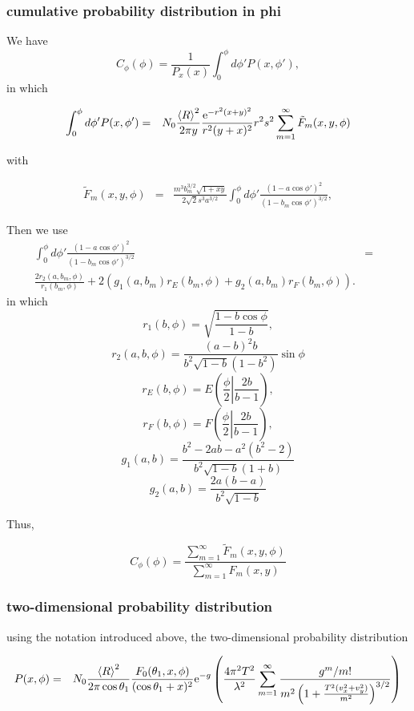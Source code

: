 \documentclass[11pt]{article}
\newcommand{\e}{{\rm e}}
\begin{document}
{{{{%
\subsubsection{cumulative probability distribution in phi}

We have
$$C_{\phi}(\phi)=\frac{1}{P_x(x)}\int_{0}^{\phi}d\phi'P(x,\phi'),$$
in which


\begin{eqnarray}
\int_{0}^{\phi}d\phi'P(x,\phi')&=&N_{0}\frac{\left<R\right>^{2}}{2\pi y}\frac{\e^{-r^{2}(x+y)^{2}}}{r^{2}(y+x)^{2}}
r^{2}s^{2}
\sum_{m=1}^{\infty}\tilde {F}_{m}(x,y,\phi)
\end{eqnarray}

with

\begin{eqnarray} \tilde F_{m}(x,y,\phi)&=&\frac{m^{3}b_{m}^{3/2}\sqrt{1+xy}}{2\sqrt{2}s^{3}a^{3/2}}\int_{0}^{\phi}d\phi'\frac{\left(1-a\cos\phi'\right)^{2}}{(1-b_m\cos\phi')^{3/2}},
\end{eqnarray}


Then we use
\begin{eqnarray}
\int_{0}^{\phi}d\phi'\frac{\left(1-a\cos\phi' \right)^{2}}{(1-b_m\cos\phi')^{3/2}}&=&\\
\frac{2r_{2}(a,b_m,\phi)}{r_{1}(b_m,\phi)}+2(g_{1}(a,b_m)r_{E}(b_m,\phi)+g_{2}(a,b_m)r_{F}(b_m,\phi)).
\end{eqnarray}
in which
$$r_{1}(b,\phi)=\sqrt{\frac{1-b\cos\phi}{1-b}},$$
$$r_{2}(a,b,\phi)=\frac{(a-b)^{2}b}{b^{2}\sqrt{1-b}(1-b^{2})}\sin\phi$$
$$r_{E}(b,\phi)=E\left(\frac{\phi}{2}\left|\frac{2b}{b-1}\right.\right),$$
$$r_{F}(b,\phi)=F\left(\frac{\phi}{2}\left|\frac{2b}{b-1}\right.\right),$$
$$g_{1}(a,b)=\frac{b^{2}-2ab-a^{2}(b^{2}-2)}{b^{2}\sqrt{1-b}(1+b)}$$
$$g_{2}(a,b)=\frac{2a(b-a)}{b^{2}\sqrt{1-b}}$$

Thus,

$$C_{\phi}(\phi)=\frac{\sum_{m=1}^{\infty} \tilde F_{m}(x,y,\phi)}{\sum_{m=1}^{\infty} F_{m}(x,y)}$$

\subsubsection{two-dimensional probability distribution}

using the notation introduced above, the two-dimensional probability distribution

\begin{eqnarray}
P(x,\phi)&=&N_{0}\frac{\left<R\right>^{2}}{2\pi\cos\theta_{1}}\frac{F_{0}(\theta_{1},x,\phi)}{(\cos{\theta_{1}}+x)^{2}}
\e^{-g}\left(\frac{4\pi^{2}T^{2}}{\lambda^{2}}\sum_{m=1}^{\infty}\frac{g^{m}/m!}{m^{2}\left(1+\frac{T^{2}(v_{x}^{2}+v_{y}^{2})}{m^{2}}\right)^{3/2}}\right)\end{eqnarray}


}}}}
\end{document}
